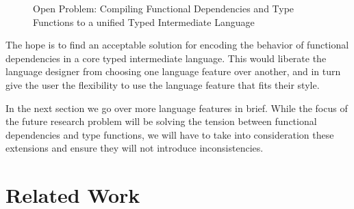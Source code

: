 \documentclass[screen,nonacm,manuscript,review]{acmart} %
\begin{document}
\begin{figure}[ht]
  \centering
{}
  \caption[Open Problem]{Open Problem: Compiling Functional Dependencies and Type
    Functions to a unified Typed Intermediate Language}
  \label{fig:future-work}
\end{figure}


The hope is to find an acceptable solution for encoding
the behavior of functional dependencies in a core typed
intermediate language. This would liberate the language designer from
choosing one language feature over another, and in turn give the
user the flexibility to use the language feature that fits their style.

In the next section we go over more language features in brief. While
the focus of the future research problem will be solving the
tension between functional dependencies and type functions, we will
have to take into consideration these extensions and ensure they
will not introduce inconsistencies.

\section{Related Work}\label{sec:related-work}
\end{document}
